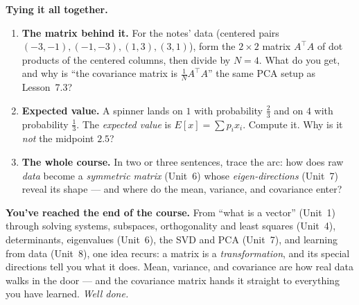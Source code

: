 \documentclass[10pt]{article}
\begin{document}
\begin{extensionbox}
\textbf{Tying it all together.}
\begin{enumerate}[label=(\alph*), leftmargin=1.8em, itemsep=5pt]
  \item \textbf{The matrix behind it.} For the notes' data (centered pairs $(-3,-1),(-1,-3),(1,3),(3,1)$), form
        the $2\times2$ matrix $A^{\top}\!A$ of dot products of the centered columns, then divide by $N=4$. What
        do you get, and why is ``the covariance matrix is $\frac1N A^{\top}\!A$'' the same PCA setup as Lesson~7.3?
  \item \textbf{Expected value.} A spinner lands on $1$ with probability $\tfrac23$ and on $4$ with probability
        $\tfrac13$. The \emph{expected value} is $E[x]=\sum p_i x_i$. Compute it. Why is it \emph{not} the
        midpoint $2.5$?
  \item \textbf{The whole course.} In two or three sentences, trace the arc: how does raw \emph{data} become a
        \emph{symmetric matrix} (Unit~6) whose \emph{eigen-directions} (Unit~7) reveal its shape --- and where do
        the mean, variance, and covariance enter?
\end{enumerate}
\end{extensionbox}

\begin{spiralbox}
\textbf{You've reached the end of the course.} From ``what is a vector'' (Unit~1) through solving systems,
subspaces, orthogonality and least squares (Unit~4), determinants, eigenvalues (Unit~6), the SVD and PCA
(Unit~7), and learning from data (Unit~8), one idea recurs: a matrix is a \emph{transformation}, and its special
directions tell you what it does. Mean, variance, and covariance are how real data walks in the door --- and the
covariance matrix hands it straight to everything you have learned. \emph{Well done.}
\end{spiralbox}
\end{document}
